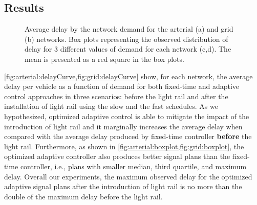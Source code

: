 \subsection{Results}


\begin{figure*}[t]
%
\centering
%
\caption{Average delay by the network demand for the arterial (a) and grid (b)
networks. Box plots representing the observed distribution of delay for 3
different values of demand for each network (c,d). The mean is presented as a
red square in the box plots.}
%
\label{fig:delayCurveAndBoxplot}
%
\end{figure*}


\cref{fig:arterial:delayCurve,fig:grid:delayCurve} show, for each network, the
average delay per vehicle as a function of demand for both fixed-time and
adaptive control approaches in three scenarios: before the light rail and after
the installation of light rail using the slow and the fast schedules.
%
As we hypothesized, optimized adaptive control is able to mitigate the impact of
the introduction of light rail and it marginally increases the average delay
when compared with the average delay produced by fixed-time controller
\textbf{before} the light rail.
%
Furthermore, as shown in \cref{fig:arterial:boxplot,fig:grid:boxplot}, the
optimized adaptive controller also produces better signal plans than the
fixed-time controller, i.e., plans with smaller median, third quartile, and
maximum delay.
%
Overall our experiments, the maximum observed delay for the optimized adaptive
signal plans after the introduction of light rail is no more than
%
%
the double of the maximum delay before the light rail.



